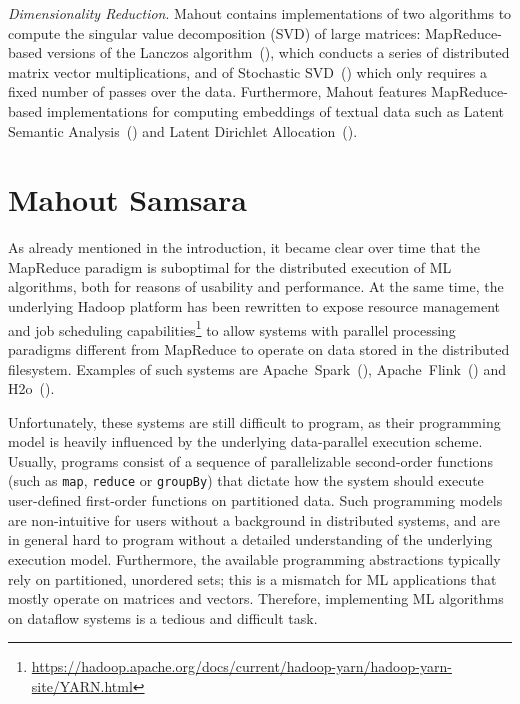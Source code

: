 \documentclass[twoside,11pt]{article}
\begin{document}
\textit{Dimensionality Reduction}. Mahout contains implementations of two algorithms to compute the singular value decomposition (SVD) of large matrices: MapReduce-based versions of the Lanczos algorithm~(\cite{Golub2012}), which conducts a series of distributed matrix vector multiplications, and of Stochastic SVD~(\cite{Halko2012}) which only requires a fixed number of passes over the data. Furthermore, Mahout features MapReduce-based implementations for computing embeddings of textual data such as Latent Semantic Analysis~(\cite{Deerwester1990}) and Latent Dirichlet Allocation~(\cite{Blei2003}).



\section{Mahout Samsara}
\label{sec:samsara}

As already mentioned in the introduction, it became clear over time that the MapReduce paradigm is suboptimal for the distributed execution of ML algorithms, both for reasons of usability and performance. At the same time, the underlying Hadoop platform has been rewritten to expose resource management and job scheduling capabilities\footnote{\url{https://hadoop.apache.org/docs/current/hadoop-yarn/hadoop-yarn-site/YARN.html}} to allow systems with parallel processing paradigms different from MapReduce to operate on data stored in the distributed filesystem. Examples of such systems are Apache~Spark~(\cite{Zaharia2012}), Apache~Flink~(\cite{Alexandrov2014}) and H2o~(\cite{H2O}). 

Unfortunately, these systems are still difficult to program, as their programming model is heavily influenced by the underlying data-parallel execution scheme. Usually, programs consist of a sequence of parallelizable second-order functions (such as \texttt{map}, \texttt{reduce} or \texttt{groupBy}) that dictate how the system should execute user-defined first-order functions on partitioned data. Such programming models are non-intuitive for users without a background in distributed systems, and are in general hard to program without a detailed understanding of the underlying execution model. Furthermore, the available programming abstractions typically rely on partitioned, unordered sets; this is a mismatch for ML applications that mostly operate on matrices and vectors. Therefore, implementing ML algorithms on dataflow systems is a tedious and difficult task. 
\end{document}
